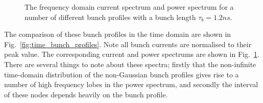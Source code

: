 \documentclass{cernrep}
\begin{document}
\begin{figure}
\caption{The frequency domain  current spectrum and  power spectrum for a number of different bunch profiles with a bunch length $\tau_{b} = 1.2ns$.}
\label{fig:freq_dom_prof}
\end{figure}

The comparison of these bunch profiles in the time domain are shown in Fig.~\ref{fig:time_bunch_profiles}. Note all bunch currents are normalised to their peak value. The corresponding current and power spectrums are shown in Fig.~\ref{fig:freq_dom_prof}. There are several things to note about these spectra; firstly that the non-infinite time-domain distribution of the non-Gaussian bunch profiles gives rise to a number of high frequency lobes in the power spectrum, and secondly the interval of these nodes depends heavily on the bunch profile.
\end{document}
